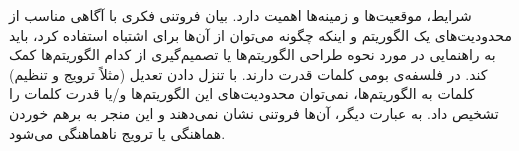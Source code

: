 شرایط، موقعیت‌ها و زمینه‌ها اهمیت دارد.
بیان فروتنی فکری با آگاهی مناسب از محدودیت‌های یک الگوریتم و اینکه چگونه می‌توان از آن‌ها برای اشتباه استفاده کرد، باید به راهنمایی در مورد نحوه طراحی الگوریتم‌ها یا تصمیم‌گیری از کدام الگوریتم‌ها کمک کند.
در فلسفه‌ی بومی کلمات قدرت دارند.
با تنزل دادن تعدیل (مثلاً ترویج و تنظیم) کلمات به الگوریتم‌ها، نمی‌توان محدودیت‌های این الگوریتم‌ها و/یا قدرت کلمات را تشخیص داد.
به عبارت دیگر، آن‌ها فروتنی نشان نمی‌دهند و این منجر به برهم خوردن هماهنگی یا ترویج ناهماهنگی می‌شود.




